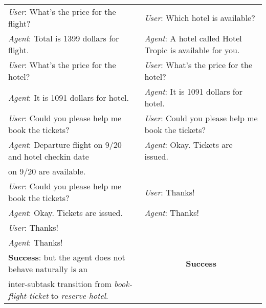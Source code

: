 \documentclass[11pt,letterpaper]{article}
\newcommand{\textbox}[2]{{\color{#1}\fbox{\normalcolor#2}}}
\begin{document}
\begin{table*}[bt!]
\begin{tabular}[t]{ll}
			\multicolumn{1}{l|}{
				\textit{User}: What's the price for the flight?} & \textit{User}: Which hotel is available? \\
			\multicolumn{1}{l|}{
				\textit{Agent}: Total is 1399 dollars for flight.} & \textit{Agent}: A hotel called Hotel Tropic is available for you. \\
			\multicolumn{1}{l|}{
				\textit{User}: What's the price for the hotel?} & \textit{User}: What's the price for the hotel? \\
			\multicolumn{1}{l|}{
				\textit{Agent}: It is 1091 dollars for hotel.} & \textit{Agent}: It is 1091 dollars for hotel. \\
			\multicolumn{1}{l|}{
				\textit{User}: Could you please help me book the tickets?} & \textit{User}: Could you please help me book the tickets? \\
			\multicolumn{1}{l|}{
				\textit{Agent}: Departure flight on 9/20 and hotel checkin date} & \textit{Agent}: Okay. Tickets are issued. \\
			\multicolumn{1}{l|}{
				on 9/20 are available.}  & \\
			\multicolumn{1}{l|}{
				\textit{User}: Could you please help me book the tickets?} & \textit{User}: Thanks! \\
			\multicolumn{1}{l|}{
				\textit{Agent}: Okay. Tickets are issued.} & \textit{Agent}: Thanks! \\
			\multicolumn{1}{l|}{
				\textit{User}: Thanks!} & \\
			\multicolumn{1}{l|}{
				\textit{Agent}: Thanks!} & \\
			\hline
			\multicolumn{1}{l|}{
			\textbf{Success}: but the agent does not behave naturally \textbox{blue}{where} is an } & \multicolumn{1}{c}{\textbf{Success}}  \rule{0pt}{1.1\normalbaselineskip} \\
			\multicolumn{1}{l|}{inter-subtask transition from \textit{book-flight-ticket} to \textit{reserve-hotel}.} &  \\ \hline
		\end{tabular}
		\label{tab:sample_dialogue}
        \vspace{-2mm}
	\end{table*}
\end{document}
